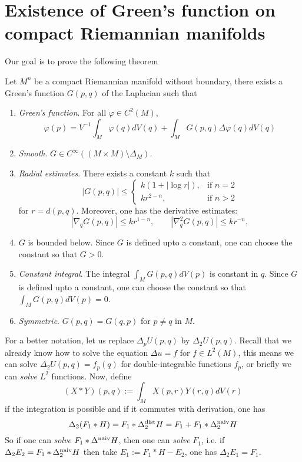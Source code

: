 \section{Existence of Green's function on compact Riemannian manifolds}
\label{sec:orgf5e83c1}

Our goal is to prove the following theorem
\begin{theorem}
\label{thm:existence-green}
Let \(M^n\) be a compact Riemannian manifold without boundary, there exists a Green's
function \(G(p,q)\) of the Laplacian such that
\begin{enumerate}
\item \emph{Green's function}. For all \(\varphi\in C^2(M)\), 
\begin{equation}
\label{eq:green-int}
   \varphi(p) = V^{-1}\int_M\varphi(q)dV(q) + \int_M G(p,q)\Delta\varphi(q) dV(q)   
\end{equation}
\item \emph{Smooth}. \(G\in C^\infty((M\times M)\setminus\Delta_M)\).
\item \emph{Radial estimates}. There exists a constant \(k\) such that
\begin{equation}
\label{eq:G-bound}
 \left| G(p,q)\right| \leq \begin{cases}
 k(1 +|\log r|)	 ,  & \text{if $n=2$} \\
 kr^{2-n}	 , & \text{if $n>2$}
 \end{cases}   
\end{equation}
for \(r=d(p,q)\). Moreover, one has the derivative estimates:
\begin{equation}
\label{eq:derivative-bound} 
\left|\nabla_q G(p,q) \right| \leq kr^{1-n},\qquad \left|\nabla^2_q G(p,q) \right| \leq kr^{-n},
\end{equation}
\item \(G\) is bounded below. Since \(G\) is defined upto a constant, one can choose the constant so that \(G>0\).
\item \emph{Constant integral}. The integral \(\int_M G(p,q) dV(p)\) is constant in \(q\). Since \(G\) is defined upto a constant, one can choose the constant so that \(\int_M G(p,q) dV(p)=0\).
\item \emph{Symmetric}. \(G(p,q) = G(q,p)\) for \(p\ne q\) in \(M\).
\end{enumerate}
\end{theorem}

For a better notation, let us replace \(\Delta_p U(p,q)\) by \(\Delta_2 U(p,q)\). Recall that we already know how to solve the equation \(\Delta u = f\) for \(f\in
L^2(M)\), this means we can solve \(\Delta_2 U(p,q) = f_p(q)\) for double-integrable functions
\(f_p\), or briefly we can \emph{solve} \(L^2\) functions. Now, define
\[
 (X* Y)(p,q):= \int_M X(p,r) Y(r,q) dV(r)
\]
if the integration is possible and if it commutes with derivation, one has
\[
 \Delta_2(F_1 * H) = F_1 *\Delta_2^{\rm dist}H = F_1 + F_1 *\Delta_2^{\rm naiv} H
\]
So if one can \emph{solve} \(F_1*\Delta^{\rm naiv}H\), then one can \emph{solve} \(F_1\),
i.e. if \(\Delta_2 E_2 = F_1 * \Delta_2^{\rm naiv}H\) then take \(E_1:= F_1*H- E_2\),
one has \(\Delta_2 E_1 = F_1\).

